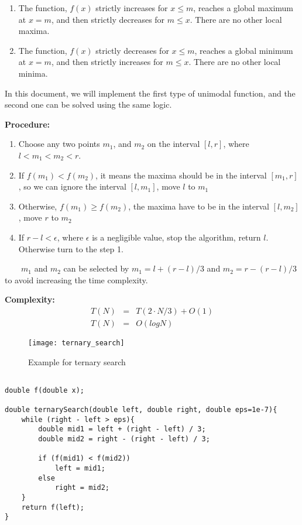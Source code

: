 \documentclass[12pt]{article}
\begin{document}
\begin{enumerate}
	\item The function, $f(x)$ strictly increases for $x \leq m$, reaches a global maximum at $x = m$, and then strictly decreases for $m \leq x$. There are no other local maxima.
	
	\item The function, $f(x)$ strictly decreases for $x \leq m$, reaches a global minimum at $x = m$, and then strictly increases for $m \leq x$. There are no other local minima.
\end{enumerate}

In this document, we will implement the first type of unimodal function, and the second one can be solved using the same logic.

\textbf{Procedure: }
\begin{enumerate}
	\item Choose any two points $m_1$, and $m_2$ on the interval $[l, r]$, where $l < m_1 < m_2 < r$.
	\item If $f(m_1) < f(m_2)$, it means the maxima should be in the interval $[m_1, r]$, so we can ignore the interval $[l, m_1]$, move $l$ to $m_1$
	\item Otherwise, $f(m_1) \geq f(m_2)$, the maxima have to be in the interval $[l, m_2]$, move $r$ to $m_2$
	\item If $r - l < \epsilon$, where $\epsilon$ is a negligible value, stop the algorithm, return $l$. Otherwise turn to the step 1. 
\end{enumerate}	

\ \ \ \  $m_1$ and $m_2$ can be selected by $m_1 = l + (r - l) / 3$ and $m_2 = r - (r - l) / 3$ to avoid increasing the time complexity.

\textbf{Complexity: }
\begin{eqnarray*}
	T(N) &=& T(2 \cdot N / 3) + O(1) \\
	T(N) &=& O(logN)
\end{eqnarray*}

\begin{figure}[h]
	\centering
	\texttt{[image: ternary\_search]}
	\caption{Example for ternary search}
	\label{fig:ternary_search}
\end{figure}

\begin{verbatim}

double f(double x);

double ternarySearch(double left, double right, double eps=1e-7){
    while (right - left > eps){
        double mid1 = left + (right - left) / 3;
        double mid2 = right - (right - left) / 3;
        
        if (f(mid1) < f(mid2))
            left = mid1;
        else
            right = mid2;
    }
    return f(left);
}
\end{verbatim}
\end{document}
